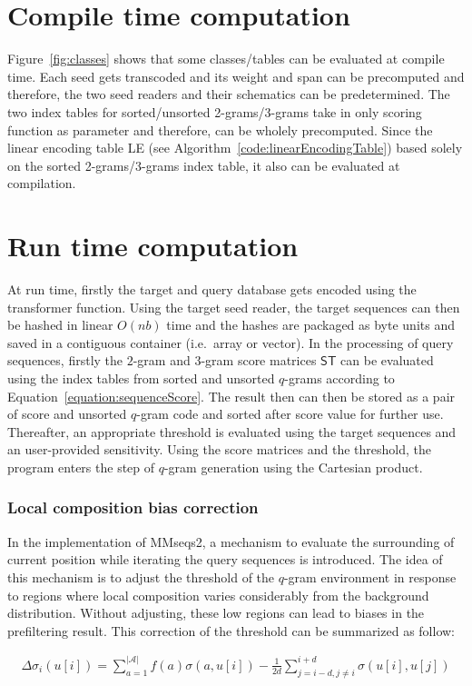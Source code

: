 \documentclass[twoside,a4paper,bsc]{master}
\newcommand{\Qgram}[1]{\(#1\)-gram}
\newcommand{\Scoretablename}[0]{\mathsf{ST}}
\newcommand{\Alpha}[0]{\mathcal{A}}
\begin{document}
\section{Compile time computation}
Figure~\ref{fig:classes} shows that some classes/tables can be evaluated at
compile time. Each seed gets transcoded and its weight and span can be
precomputed and therefore, the two seed readers and their schematics can be
predetermined. The two index tables for sorted/unsorted 2-grams/3-grams
take in only scoring function as parameter and therefore, can be wholely
precomputed. Since the linear encoding table LE (see
Algorithm~\ref{code:linearEncodingTable}) based solely on the sorted
2-grams/3-grams index table, it also can be evaluated at compilation.
\section{Run time computation}
At run time, firstly the target and query database gets encoded using the
transformer function. Using the target seed reader, the target sequences
can then be hashed in linear \(O(nb)\) time and the hashes are packaged as
byte units and saved in a contiguous container (i.e.\ array or vector).
In the processing of query sequences, firstly the \Qgram{2} and \Qgram{3}
score matrices \(\Scoretablename\) can be evaluated using the index tables
from sorted and unsorted \Qgram{q}s according to
Equation~\ref{equation:sequenceScore}. The result then can then be stored
as a pair of score and unsorted \Qgram{q} code and sorted after score
value for further use. Thereafter, an appropriate threshold is evaluated
using the target sequences and an user-provided sensitivity. Using the
score matrices and the threshold, the program enters the step of \Qgram{q}
generation using the Cartesian product.
\subsubsection{Local composition bias correction}
In the implementation of MMseqs2, a mechanism to evaluate the surrounding
of current position while iterating the query sequences is introduced. The
idea of this mechanism is to adjust the threshold of the \Qgram{q}
environment in response to regions where local composition varies
considerably from the background distribution. Without adjusting, these low
regions can lead to biases in the prefiltering result. This correction of
the threshold can be summarized as follow:

\begin{align}
\Delta \sigma_i(u[i]) =
\sum_{a=1}^{|\Alpha|}f(a)\sigma(a,u[i])-\frac{1}{2d}\sum_{j=i-d,j\neq
i}^{i+d}\sigma (u[i],u[j])
\end{align}
\end{document}
